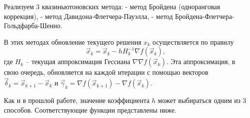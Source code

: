 \documentclass[11pt]{article}
\begin{document}
    Реализуем 3 квазиньютоновских метода: - метод Бройдена (одноранговая
коррекция), - метод Давидона-Флетчера-Пауэлла, - метод
Бройдена-Флетчера-Гольдфарба-Шенно.

В этих методах обновление текущего решения \(x_k\) осуществляется по
правилу \begin{equation*}
    \vec{x}_k = \vec{x}_k - h H_k^{-1} \nabla{f(\vec{x}_k)},
\end{equation*} где \(H_k\) -- текущая аппроксимация Гессиана
\(\nabla\nabla{f(\vec{x}_k)}\). Эта аппроксимация, в свою очередь,
обновляется на каждой итерации с помощью векторов
\(\vec{\delta}_k = \vec{x}_{k+1} - \vec{x}_k\) и
\(\vec{\gamma}_k = \nabla{f(\vec{x}_{k+1})} - \nabla{f(\vec{x}_k)}\).

Как и в прошлой работе, значение коэффициента \(h\) может выбираться
одним из 3 способов. Соответствующие функции представлены ниже.
    \newpage
\end{document}
